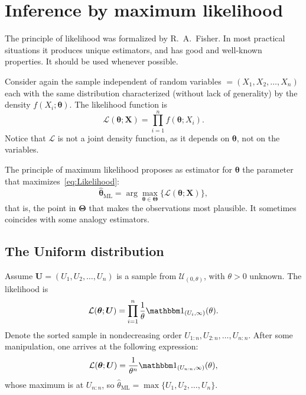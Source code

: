 \section{Inference by maximum likelihood}

The principle of likelihood was formalized by R.\ A.\ Fisher.
In most practical situations it produces unique estimators, and has good and well-known properties.
It should be used whenever possible.

Consider again the sample independent of random variables $\bm = (X_1,X_2,\dots,X_n)$ each with the same distribution characterized (without lack of generality) by the density $f(X_i;\bm \theta)$.
The likelihood function is
\begin{equation}
\mathcal L(\bm \theta;\bm X) = \prod_{i=1}^{n} f(\bm \theta;X_i).
\label{eq:Likelihood}
\end{equation}
Notice that $\mathcal L$ is not a joint density function, as it depends on $\bm \theta$, not on the variables.

The principle of maximum likelihood proposes as estimator for $\bm \theta$ the parameter that maximizes~\eqref{eq:Likelihood}:
\begin{equation}
\widehat{\bm \theta}_{\text{ML}} = \arg\max_{\bm\theta\in\bm{\Theta}}
\Big\{ \mathcal L(\bm \theta;\bm X)
\Big\},
\end{equation}
that is, the point in $\bm \Theta$ that makes the observations most plausible.
It sometimes coincides with some analogy estimators.

\subsection{The Uniform distribution}

Assume $\bm U=(U_1,U_2,\dots, U_n)$ is a sample from $\mathcal U_{(0,\theta)}$, with $\theta>0$ unknown.
The likelihood is
\begin{equation}
\mathcal L(\bm \theta;\bm U) = \prod_{i=1}^{n} \frac1\theta \mathbbm 1_{(U_i,\infty)}(\theta).
\label{eq:LikelihoodUniform}
\end{equation}
Denote the sorted sample in nondecreasing order $U_{1:n},U_{2:n},\dots,U_{n:n}$.
After some manipulation, one arrives at the following expression:
\begin{equation}
\mathcal L(\bm \theta;\bm U) = \frac1{\theta^n} \mathbbm 1_{(U_{n:n},\infty)} (\theta),
\label{eq:LikelihoodUniformReady}
\end{equation}
whose maximum is at $U_{n:n}$, so 
$\widehat{\theta}_{\text{ML}}=\max \{U_1,U_2,\dots,U_n\}$.

